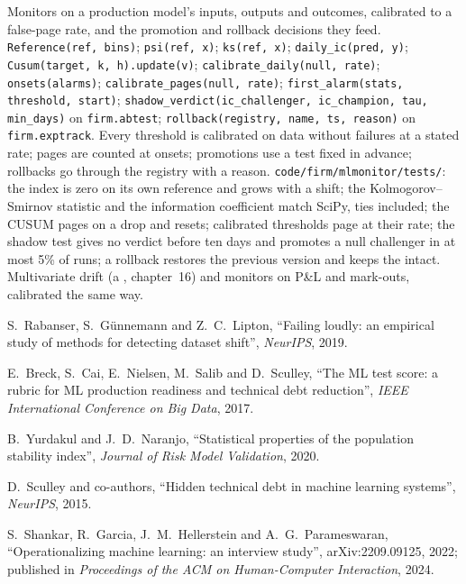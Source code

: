\begin{build}
 Monitors on a production model's inputs, outputs and outcomes, calibrated to a false-page rate, and the
promotion and rollback decisions they feed.
 \texttt{Reference(ref, bins)}; \texttt{psi(ref, x)}; \texttt{ks(ref, x)}; \texttt{daily\_ic(pred, y)};
\texttt{Cusum(target, k, h).update(v)}; \texttt{calibrate\_daily(null, rate)}; \texttt{onsets(alarms)};
\texttt{calibrate\_pages(null, rate)}; \texttt{first\_alarm(stats, threshold, start)}; \texttt{shadow\_verdict(ic\_challenger,
ic\_champion, tau, min\_days)} on \texttt{firm.abtest}; \texttt{rollback(registry, name, ts, reason)} on \texttt{firm.exptrack}.
 Every threshold is calibrated on data without failures at a stated rate; pages are counted at onsets; promotions
use a test fixed in advance; rollbacks go through the registry with a reason.
 \texttt{code/firm/mlmonitor/tests/}: the index is zero on its own reference and grows with a shift; the
Kolmogorov--Smirnov statistic and the information coefficient match SciPy, ties included; the CUSUM pages on a drop and resets;
calibrated thresholds page at their rate; the shadow test gives no verdict before ten days and promotes a null challenger in at
most 5\% of runs; a rollback restores the previous version and keeps the  intact.
 Multivariate drift (a , chapter~16) and monitors on P\&L and mark-outs, calibrated the
same way.
\end{build}

\begin{omsources}
\item S.~Rabanser, S.~Günnemann and Z.~C.~Lipton, ``Failing loudly: an empirical study of methods for detecting dataset
shift'', \emph{NeurIPS}, 2019.
\item E.~Breck, S.~Cai, E.~Nielsen, M.~Salib and D.~Sculley, ``The ML test score: a rubric for ML production readiness and
technical debt reduction'', \emph{IEEE International Conference on Big Data}, 2017.
\item B.~Yurdakul and J.~D.~Naranjo, ``Statistical properties of the population stability index'', \emph{Journal of Risk Model
Validation}, 2020.
\item D.~Sculley and co-authors, ``Hidden technical debt in machine learning systems'', \emph{NeurIPS}, 2015.
\item S.~Shankar, R.~Garcia, J.~M.~Hellerstein and A.~G.~Parameswaran, ``Operationalizing machine learning: an interview
study'', arXiv:2209.09125, 2022; published in \emph{Proceedings of the ACM on Human-Computer Interaction}, 2024.
\end{omsources}

